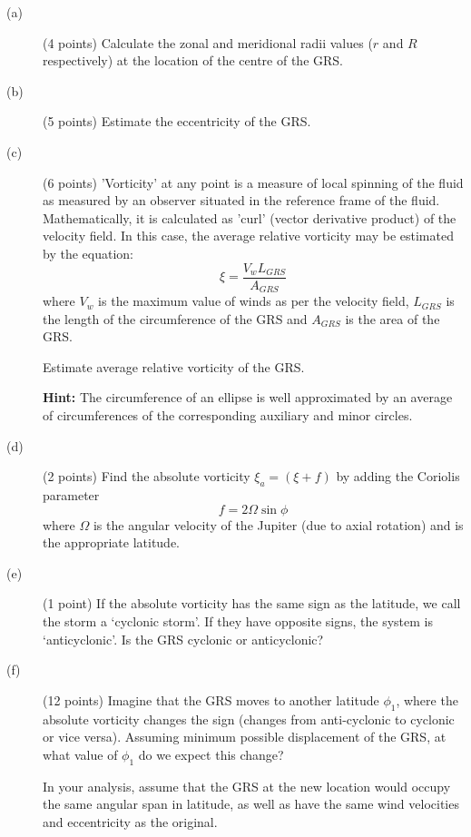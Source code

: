 \begin{description}
\item[(a)] (4 points) Calculate the zonal and meridional radii values ($r$
  and $R$ respectively) at the location of the centre of the GRS.
\item[(b)] (5 points) Estimate the eccentricity of the GRS.
\item[(c)] (6 points) 'Vorticity' at any point is a measure of local spinning
  of the fluid as measured by an observer situated in the reference frame of
  the fluid. Mathematically, it is calculated as 'curl' (vector derivative
  product) of the velocity field. In this case, the average relative
  vorticity may be estimated by the equation:
  \[ \xi = \frac{V_w L_{GRS}}{A_{GRS}} \]
  where $V_w$ is the maximum value of winds as per the velocity field,
  $L_{GRS}$ is the length of the circumference of the GRS and $A_{GRS}$ is
  the area of the GRS.

  Estimate average relative vorticity of the GRS.

  \textbf{Hint:} The circumference of an ellipse is well approximated by an
  average of circumferences of the corresponding auxiliary and minor circles.
\item[(d)] (2 points) Find the absolute vorticity $\xi_a = (\xi + f)$ by
  adding the Coriolis parameter
  \[ f = 2\Omega \sin\phi \]
  where $\Omega$ is the angular velocity of the Jupiter (due to axial
  rotation) and is the appropriate latitude.
\item[(e)] (1 point) If the absolute vorticity has the same sign as the
  latitude, we call the storm a `cyclonic storm'. If they have opposite
  signs, the system is `anticyclonic'. Is the GRS cyclonic or anticyclonic?
\item[(f)] (12 points) Imagine that the GRS moves to another latitude
  $\phi_1$, where the absolute vorticity changes the sign (changes from
  anti-cyclonic to cyclonic or vice versa). Assuming minimum possible
  displacement of the GRS, at what value of $\phi_1$ do we expect this
  change?

  In your analysis, assume that the GRS at the new location would occupy the
  same angular span in latitude, as well as have the same wind velocities and
  eccentricity as the original.
\end{description}
